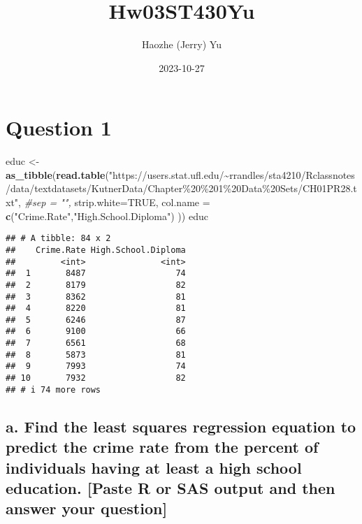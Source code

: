 \documentclass[
]{article}
\title{Hw03ST430Yu}
\author{Haozhe (Jerry) Yu}
\date{2023-10-27}
\newenvironment{Shaded}{\begin{snugshade}}{\end{snugshade}}
\newcommand{\AttributeTok}[1]{\textcolor[rgb]{0.13,0.29,0.53}{#1}}
\newcommand{\CommentTok}[1]{\textcolor[rgb]{0.56,0.35,0.01}{\textit{#1}}}
\newcommand{\ConstantTok}[1]{\textcolor[rgb]{0.56,0.35,0.01}{#1}}
\newcommand{\FunctionTok}[1]{\textcolor[rgb]{0.13,0.29,0.53}{\textbf{#1}}}
\newcommand{\NormalTok}[1]{#1}
\newcommand{\OtherTok}[1]{\textcolor[rgb]{0.56,0.35,0.01}{#1}}
\newcommand{\StringTok}[1]{\textcolor[rgb]{0.31,0.60,0.02}{#1}}
\begin{document}
\maketitle

\hypertarget{question-1}{%
\section{Question 1}\label{question-1}}

\begin{Shaded}
\begin{Highlighting}[]
\NormalTok{educ }\OtherTok{\textless{}{-}} \FunctionTok{as\_tibble}\NormalTok{(}\FunctionTok{read.table}\NormalTok{(}\StringTok{"https://users.stat.ufl.edu/\textasciitilde{}rrandles/sta4210/Rclassnotes/data/textdatasets/KutnerData/Chapter\%20\%201\%20Data\%20Sets/CH01PR28.txt"}\NormalTok{, }
            \CommentTok{\#sep = "", }
            \AttributeTok{strip.white=}\ConstantTok{TRUE}\NormalTok{,}
            \AttributeTok{col.name =} \FunctionTok{c}\NormalTok{(}\StringTok{"Crime.Rate"}\NormalTok{,}\StringTok{"High.School.Diploma"}\NormalTok{)}
\NormalTok{            ))}
\NormalTok{educ}
\end{Highlighting}
\end{Shaded}

\begin{verbatim}
## # A tibble: 84 x 2
##    Crime.Rate High.School.Diploma
##         <int>               <int>
##  1       8487                  74
##  2       8179                  82
##  3       8362                  81
##  4       8220                  81
##  5       6246                  87
##  6       9100                  66
##  7       6561                  68
##  8       5873                  81
##  9       7993                  74
## 10       7932                  82
## # i 74 more rows
\end{verbatim}

\hypertarget{a.-find-the-least-squares-regression-equation-to-predict-the-crime-rate-from-the-percent-of-individuals-having-at-least-a-high-school-education.-paste-r-or-sas-output-and-then-answer-your-question}{%
\subsection{a. Find the least squares regression equation to predict the
crime rate from the percent of individuals having at least a high school
education. {[}Paste R or SAS output and then answer your
question{]}}\label{a.-find-the-least-squares-regression-equation-to-predict-the-crime-rate-from-the-percent-of-individuals-having-at-least-a-high-school-education.-paste-r-or-sas-output-and-then-answer-your-question}}
\end{document}

